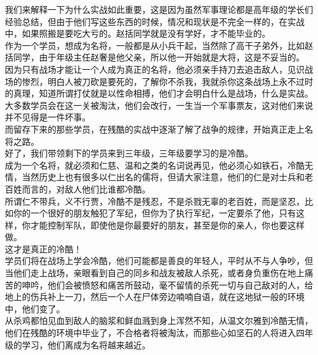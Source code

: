 \begin{multicols}{\theparacolNo}
我们来解释一下为什么实战如此重要，这是因为虽然军事理论都是高年级的学长们经验总结，但由于他们写这些东西的时候，情况和现状是不完全一样的，在实战中，如果照搬是要吃大亏的。赵括同学就是没有学好，才不能毕业的。\\

作为一个学员，想成为名将，一般都是从小兵干起，当然除了高干子弟外，比如赵括同学，由于年级主任赵奢是他父亲，所以他一开始就是大将，这是不妥当的。\\

因为只有战场才能让一个人成为真正的名将，他必须亲手持刀去追击敌人，见识战场的惨烈，明白人被刀砍是要死的，了解你不杀我，我就杀你这条战场上永不过时的真理，知道所谓打仗就是以性命相搏，他们才会明白什么是战场，什么是实战。\\

大多数学员会在这一关被淘汰，他们会改行，一生当一个军事票友，这对他们来说并不见得是一件坏事。\\

而留存下来的那些学员，在残酷的实战中逐渐了解了战争的规律，开始真正走上名将之路。\\

好了，我们带领剩下的学员来到三年级，三年级要学习的是冷酷。\\

成为一个名将，就必须和仁慈、温和之类的名词说再见，他必须心如铁石，冷酷无情，当然历史上也有很多以仁出名的儒将，但请大家注意，他们的仁是对士兵和老百姓而言的，对敌人他们比谁都冷酷。\\

所谓仁不带兵，义不行贾，冷酷不是残忍，不是杀戮无辜的老百姓，而是坚忍，比如你的一个很好的朋友触犯了军纪，但你为了执行军纪，一定要杀了他，只有这样，你才能控制军队，即使他是你最要好的朋友，甚至是你的亲人，你也要这样做。\\

这才是真正的冷酷！\\

学员们将在战场上学会冷酷，他们可能都是善良的年轻人，平时从不与人争吵，但当他们走上战场，亲眼看到自己的同乡和战友被敌人杀死，或者身负重伤在地上痛苦的呻吟，他们会被愤怒和痛苦所鼓动，毫不留情的杀死一切与自己敌对的人，给地上的伤兵补上一刀，然后一个人在尸体旁边喃喃自语，就在这地狱一般的环境中，他们变了。\\

从杀鸡都怕见血到敌人的脑浆和鲜血溅到身上浑然不知，从温文尔雅到冷酷无情，他们在残酷的环境中毕业了，不合格者将被淘汰，而那些心如坚石的人将进入四年级的学习，他们离成为名将越来越近。\\


\end{multicols}

